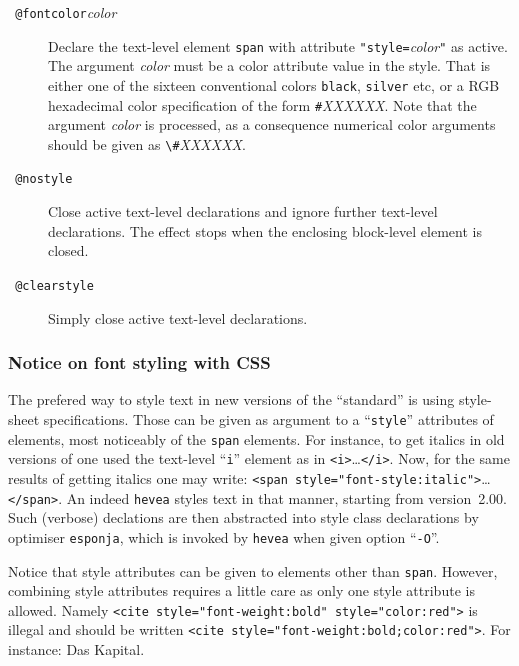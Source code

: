 \begin{description}
\item[{\tt{} @fontcolor}{\it color}{\tt{}}]
Declare the text-level element \verb+span+ with attribute
\verb+"style=+\textit{color}\verb+"+ as active.
The argument \textit{color} must be a color attribute value in the \html{}
style. That is either one of the sixteen conventional colors
\verb+black+, \verb+silver+ etc, or a RGB hexadecimal color specification
of the form
\verb+#+\textit{XXXXXX}.
Note that the argument \textit{color} is processed, as a consequence
numerical color arguments should be given as \verb+\#+\textit{XXXXXX}.



\item[{\tt{} @nostyle}]
Close active text-level declarations and ignore further text-level
declarations.
The effect stops when the enclosing block-level element is closed.
\item[{\tt{} @clearstyle}]
Simply close active text-level declarations.
\end{description}

\subsubsection*{Notice on font styling with CSS}

The prefered way to style text in new versions of the \html{} ``standard''
is using style-sheet specifications. Those can be given as argument to
a ``\texttt{style}'' attributes of \html{} elements, most noticeably
of the \texttt{span} elements.
For instance, to get italics in old versions of \html{} one used
the text-level ``\texttt{i}'' element as in
\verb+<i>+\ldots\verb+</i>+. Now, for the same results of getting
 italics one may write:
\verb+<span style="font-style:italic">+\ldots\verb+</span>+.
An indeed \texttt{hevea} styles text in that manner,
starting from version~2.00.
Such (verbose) declations are then abstracted into style class declarations
by \hevea{} optimiser \texttt{esponja}, which is invoked by \texttt{hevea}
when given option ``\texttt{-O}''.

Notice that style attributes can be given to elements other than \texttt{span}.
However, combining style attributes requires a little care as only one style
attribute is allowed.
Namely \verb+<cite style="font-weight:bold" style="color:red">+
is illegal and should be written 
\verb+<cite style="font-weight:bold;color:red">+.
\ifhevea
For instance:
{Das Kapital}.
\fi

